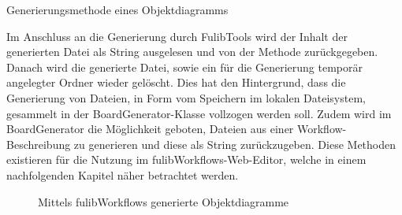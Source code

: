 \begin{listing}[!ht]
    \inputminted[firstnumber=95]{java}{listings/3.1.4/ObjectGeneration.java}
    \caption{Generierungsmethode eines Objektdiagramms}
    \label{listing:object-gen}
\end{listing}

Im Anschluss an die Generierung durch FulibTools wird der Inhalt der generierten Datei als String ausgelesen und von der Methode zurückgegeben.
Danach wird die generierte Datei, sowie ein für die Generierung temporär angelegter Ordner wieder gelöscht.
Dies hat den Hintergrund, dass die Generierung von Dateien, in Form vom Speichern im lokalen Dateisystem, gesammelt in der BoardGenerator-Klasse vollzogen werden soll.
Zudem wird im BoardGenerator die Möglichkeit geboten, Dateien aus einer Workflow-Beschreibung zu generieren und diese als String zurückzugeben.
Diese Methoden existieren für die Nutzung im fulibWorkflows-Web-Editor, welche in einem nachfolgenden Kapitel näher betrachtet werden.

\begin{figure}%
    \centering
    \qquad
    \caption{Mittels fulibWorkflows generierte Objektdiagramme}%
    \label{fig:generated-object}%
\end{figure}

